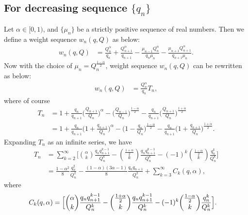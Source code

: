 \documentclass[12pt]{amsart}
\theoremstyle{definition}
\theoremstyle{plain}
\theoremstyle{definition}
\numberwithin{equation}{section}
\begin{document}
\subsection{For decreasing sequence $\{q_n\}$}
Let $\alpha\in[0,1)$, and $\{\mu_{n}\}$ be a strictly positive sequence of real numbers. Then we define a weight sequence $w_{n}(q, Q)$ as below:
\begin{align*}
w_{n}(q,Q)& =\frac{Q_{n}^{\alpha}}{q_{n}}+\frac{Q_{n+1}^{\alpha}}{q_{n+1}}-\frac{\mu_{n-1}Q_{n}^{\alpha}}{q_{n}\mu_{n}}-\frac{\mu_{n+1}Q_{n+1}^{\alpha}}{q_{n+1}\mu_{n}}.
\end{align*}
Now with the choice of $\mu_{n}=Q_{n}^{\frac{1-\alpha}{2}}$, weight sequence $w_{n}(q, Q)$ can be rewritten as below:
\begin{align*}
w_{n}(q, Q)& =\frac{Q_{n}^{\alpha}}{q_{n}}T_{n},
\end{align*}
where of course
\begin{align*}
T_{n}& =1+\frac{q_{n}}{q_{n+1}}\big(\frac{Q_{n+1}}{Q_{n}}\big)^{\alpha}-\big(\frac{Q_{n-1}}{Q_{n}}\big)^{\frac{1-\alpha}{2}}-
\frac{q_{n}}{q_{n+1}}\big(\frac{Q_{n+1}}{Q_{n}}\big)^{\frac{1+\alpha}{2}}\\
&=1+\frac{q_{n}}{q_{n+1}}\Big(1+\frac{q_{n+1}}{Q_{n}}\Big)^{\alpha}-\Big(1-\frac{q_{n}}{Q_{n}}\Big)^{\frac{1-\alpha}{2}}-
\frac{q_{n}}{q_{n+1}}\Big(1+\frac{q_{n+1}}{Q_{n}}\Big)^{\frac{1+\alpha}{2}}.
\end{align*}
Expanding $T_{n}$ as an infinite series, we have
\begin{align*}
T_{n}&=\displaystyle\sum_{k=2}^{\infty}\Big[\binom{\alpha}{k}\frac{q_{n}q_{n+1}^{k-1}}{Q_{n}^{k}}-\binom{\frac{1+\alpha}{2}}{k}
\frac{q_{n}q_{n+1}^{k-1}}{Q_{n}^{k}}-(-1)^{k}\binom{\frac{1-\alpha}{2}}{k}\frac{q_{n}^{k}}{Q_{n}^{k}}\Big]\\
&=\frac{1-\alpha^{2}}{8}\frac{q_{n}^{2}}{Q_{n}^{2}}-\frac{(1-\alpha)(3\alpha-1)}{8}\frac{q_{n}q_{n+1}}{Q_{n}^{2}}+\displaystyle\sum_{k=3}^{\infty}C_{k}(q,\alpha),
\end{align*}
where
\begin{align}{\label{CK-equation}}
C_{k}(q,\alpha)&=\Big[\binom{\alpha}{k}\frac{q_{n}q_{n+1}^{k-1}}{Q_{n}^{k}}-\binom{\frac{1+\alpha}{2}}{k}
\frac{q_{n}q_{n+1}^{k-1}}{Q_{n}^{k}}-(-1)^{k}\binom{\frac{1-\alpha}{2}}{k}\frac{q_{n}^{k}}{Q_{n}^{k}}\Big].
\end{align}
\end{document}
